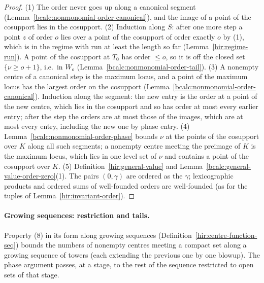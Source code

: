 \begin{proof}
\mixedleanok
(1) The order never goes up along a canonical segment (Lemma~\ref{bcalc:nonmonomial-order-canonical}), and the image of a point of the cosupport lies in the cosupport.
(2) Induction along \(S\): after one more step a point \(z\) of order \(o\) lies over a point of the cosupport of order exactly \(o\) by (1), which is in the
regime with run at least the length so far (Lemma~\ref{hir:regime-run}). A point of the cosupport at \(T_0\) has order \(\le o\), so it is off the closed set
\(\{\nu\ge o+1\}\), i.e.\ in \(W_o\) (Lemma~\ref{bcalc:nonmonomial-order-tail}).
(3) A nonempty centre of a canonical step is the maximum locus, and a point of the maximum locus has the largest order on the cosupport
(Lemma~\ref{bcalc:nonmonomial-order-canonical}). Induction along the segment: the new entry is the order at a point of the new centre, which lies in the cosupport and so
has order at most every earlier entry; after the step the orders are at most those of the images, which are at most every entry, including the new one by phase entry.
(4) Lemma~\ref{bcalc:nonmonomial-order-phase} bounds \(\nu\) at the points of the cosupport over \(K\) along all such segments; a nonempty centre meeting the preimage of
\(K\) is the maximum locus, which lies in one level set of \(\nu\) and contains a point of the cosupport over \(K\).
(5) Definition~\ref{hir:general-value} and Lemma~\ref{bcalc:general-value-order-zero}(1). The pairs \((0,\gamma)\) are ordered as the \(\gamma\); lexicographic products and
ordered sums of well-founded orders are well-founded (as for the tuples of Lemma~\ref{hir:invariant-order}).
\end{proof}

\paragraph{Growing sequences: restriction and tails.} Property (8) in its form along growing sequences
(Definition~\ref{hir:centre-function-seq}) bounds the numbers of nonempty centres meeting a compact set along a growing sequence of towers (each extending the
previous one by one blowup). The phase argument passes, at a stage, to the rest of the sequence restricted to open sets of that stage.

